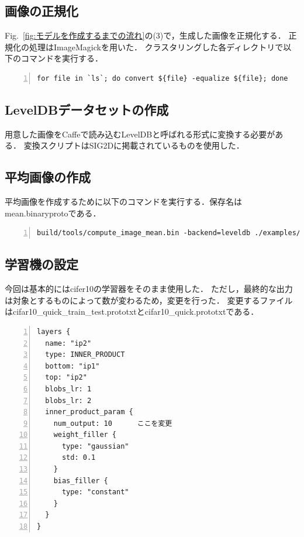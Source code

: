 \documentclass[a4paper,10pt]{jsarticle}
\begin{document}
\subsection{画像の正規化}
Fig.~\ref{fig:モデルを作成するまでの流れ}の(3)で，生成した画像を正規化する．
正規化の処理はImageMagickを用いた．
クラスタリングした各ディレクトリで以下のコマンドを実行する．

\begin{lstlisting}[basicstyle=\ttfamily\footnotesize, frame=single, firstnumber=1, numbers=left, breaklines=true]
for file in `ls`; do convert ${file} -equalize ${file}; done
\end{lstlisting}

\subsection{LevelDBデータセットの作成}
用意した画像をCaffeで読み込むLevelDBと呼ばれる形式に変換する必要がある．
変換スクリプトはSIG2D\cite{SIG2D}に掲載されているものを使用した．

\subsection{平均画像の作成}
平均画像を作成するために以下のコマンドを実行する．保存名はmean.binaryprotoである．
\begin{lstlisting}[basicstyle=\ttfamily\footnotesize, frame=single, firstnumber=1, numbers=left, breaklines=true]
build/tools/compute_image_mean.bin -backend=leveldb ./examples/cifar10/cifar10_train_leveldb ./examples/cifar10/mean.binaryproto
\end{lstlisting}

\subsection{学習機の設定}
今回は基本的にはcifer10の学習器をそのまま使用した．
ただし，最終的な出力は対象とするものによって数が変わるため，変更を行った．
変更するファイルはcifar10\_quick\_train\_test.prototxtとcifar10\_quick.prototxtである．

\begin{lstlisting}[basicstyle=\ttfamily\footnotesize, frame=single, firstnumber=1, numbers=left, breaklines=true]
layers {
  name: "ip2"
  type: INNER_PRODUCT
  bottom: "ip1"
  top: "ip2"
  blobs_lr: 1
  blobs_lr: 2
  inner_product_param {
    num_output: 10      ここを変更
    weight_filler {
      type: "gaussian"
      std: 0.1
    }
    bias_filler {
      type: "constant"
    }
  }
}
\end{lstlisting}
\end{document}
